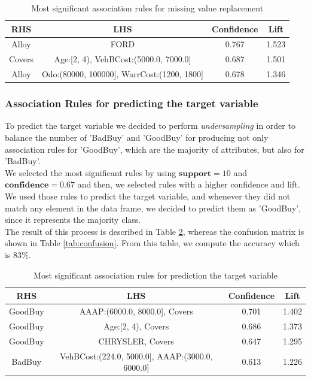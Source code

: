 \documentclass{article}
\begin{document}
	
	\begin{table}[H]
		\centering
		\begin{tabular}{|cc|cc|}
			\hline
			\textbf{RHS} & \textbf{LHS} & \textbf{Confidence} & \textbf{Lift} \\
			\hline
			\rowcolor{Gray}
			Alloy & FORD  & 0.767 & 1.523\\
			Covers & Age:[2, 4), VehBCost:(5000.0, 7000.0]  & 0.687 & 1.501 \\
			\rowcolor{Gray}
			Alloy &  Odo:(80000, 100000], WarrCost:(1200, 1800] &  0.678 & 1.346 \\
			\hline
		\end{tabular}
		\caption{Most significant association rules for missing value replacement}
		\label{tab:missingvalrules}
	\end{table}
	
	
	\subsubsection{Association Rules for predicting the target variable}
	To predict the target variable we decided to perform \emph{undersampling} in order to balance the number of 'BadBuy' and 'GoodBuy' for producing not only association rules for 'GoodBuy', which are the majority of attributes, but also for 'BadBuy'.\\
	We selected the most significant rules by using $\mathbf{support}=10$ and $\mathbf{confidence} = 0.67$ and then, we selected rules with a higher confidence and lift.\\
	We used those rules to predict the target variable, and whenever they did not match any element in the data frame, we decided to predict them as 'GoodBuy', since it represents the majority class. \\
	The result of this process is described in Table \ref{tab:predict}, whereas the confusion matrix is shown in Table \ref{tab:confusion}.
	From this table, we compute the accuracy which is 83\%.
	
	\begin{table}[H]
		\centering
		\begin{tabular}{|cc|cc|}
			\hline
			\textbf{RHS} & \textbf{LHS} & \textbf{Confidence} & \textbf{Lift} \\
			\hline
			\rowcolor{Gray}
			GoodBuy & AAAP:(6000.0, 8000.0], Covers  & 0.701 & 1.402 \\
			GoodBuy & Age:[2, 4), Covers & 0.686 & 1.373 \\
			\rowcolor{Gray}
			GoodBuy &  CHRYSLER, Covers &  0.647 & 1.295 \\
			BadBuy &  VehBCost:(224.0, 5000.0], AAAP:(3000.0, 6000.0] & 0.613 & 1.226\\
			\hline
		\end{tabular}
		\caption{Most significant association rules for prediction the target variable}
		\label{tab:predict}
	\end{table}
	
\end{document}
